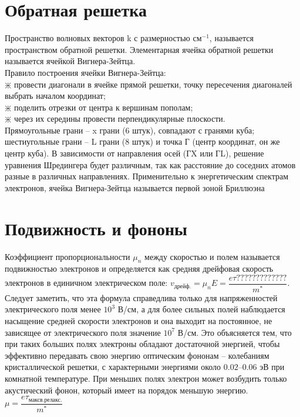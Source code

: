 \begin{multicols*}{2}
		\section{Обратная решетка}
		Пространство волновых векторов k с размерностью $\text{см}^{-1}$, называется пространством обратной решетки. Элементарная ячейка обратной решетки называется ячейкой Вигнера-Зейтца.\\
		Правило построения ячейки Вигнера-Зейтца:\\
		$\divideontimes$ провести диагонали в ячейке прямой решетки, точку пересечения диагоналей выбрать началом координат;\\
		$\divideontimes$ поделить отрезки от центра к вершинам пополам;\\
		$\divideontimes$ через их середины провести перпендикулярные плоскости.\\
		Прямоугольные грани – x грани (6 штук), совпадают с гранями куба; шестиугольные грани – L грани (8 штук) и точка Г (центр координат, он же центр куба). В зависимости от направления осей (ГX или ГL), решение уравнения Шредингера будет различным, так как расстояние до соседних атомов разные в различных направлениях. Применительно к энергетическим спектрам электронов, ячейка Вигнера-Зейтца называется первой зоной Бриллюэна

		\section{Подвижность и фононы}
		Коэффициент пропорциональности $\mu_n$ между скоростью и полем называется подвижностью электронов и определяется как средняя дрейфовая скорость электронов в единичном электрическом поле: $v_\text{дрейф.} = \mu_n E = \dfrac{e \tau ?????????????}{m^*}$. Следует заметить, что эта формула справедлива только для напряженностей электрического поля менее $10^3$ В/см, а для более сильных полей наблюдается насыщение средней скорости электронов и она выходит на постоянное, не зависящее от электрического поля значение $10^7$ В/см. Это объясняется тем, что при таких больших полях электроны обладают достаточной энергией, чтобы эффективно передавать свою энергию оптическим фононам – колебаниям кристаллической решетки, с характерными энергиями около $0.02–0.06$ эВ при комнатной температуре. При меньших полях электрон может возбудить только акустический фонон, который имеет на порядок меньшую энергию.\\
		$\mu = \dfrac{e \tau_\text{максв.релакс.}}{m^*}$


\end{multicols*}
